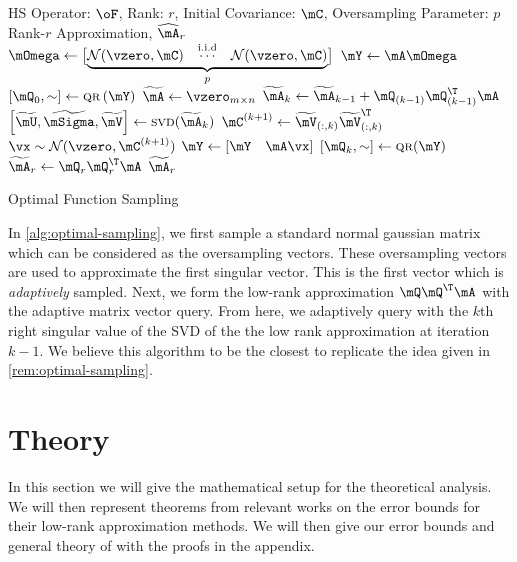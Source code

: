 \documentclass[10pt]{article}
\newcommand{\ccref}[1]{\textcolor{darkred}{\cref{#1}}}
\newcommand{\Ccref}[1]{\textcolor{darkred}{\Cref{#1}}}
\theoremstyle{plain}
\theoremstyle{definition}
\theoremstyle{remark}
\begin{document}
\begin{algorithm}
\begin{algorithmic}[1]
	 HS Operator: $\oF$, Rank: $r$, Initial Covariance: $\mC$, Oversampling Parameter: $p$
	 Rank-$r$ Approximation, $\widehat{\mA}_r$
	\State $\mOmega \gets \bigl[\underbrace{\mathcal{N}(\vzero, \mC)\quad \overset{\mathrm{i.i.d}}{\cdots} \quad \mathcal{N}(\vzero,\mC)}_{p}\bigr]$ 
	\State $\mY \gets \mA \mOmega$ 
	\State $\left[\mQ_0, \sim\right] \gets \textsc{qr}\left(\mY\right) $ 
	\State $\widetilde{\mA} \gets \vzero_{m \times n}$ 
	\State $\widetilde{\mA}_{k} \gets \widetilde{\mA}_{k-1} + \mQ_{(k-1)}\mQ_{(k-1)}^{\T}\mA$ 
	\State $\left[\widetilde{\mU}, \widetilde{\mSigma}, \widetilde{\mV}\right] \gets \textsc{svd}(\widetilde{\mA}_k)$
	\State $\displaystyle \mC^{(k+1)} \gets \widetilde{\mV}_{(:,k)}\widetilde{\mV}_{(:,k)}^{\T}$
	\State $\vx \sim \mathcal{N}(\vzero, \mC^{(k+1)})$
	\State $\mY \gets \left[\mY \quad \mA\vx\right]$ 
	\State $\left[\mQ_{k}, \sim\right] \gets \textsc{qr}(\mY)$
	\EndFor
	\State $\widetilde{\mA}_{r} \gets \mQ_r \mQ_r^{\T} \mA$ 
	$ \widetilde{\mA}_{r} $
\end{algorithmic}
\caption{Optimal Function Sampling}
\label{alg:optimal-sampling}
\end{algorithm}

In \ccref{alg:optimal-sampling}, we first sample a standard normal gaussian matrix which can be considered as the oversampling vectors. These oversampling vectors are used to approximate the first singular vector. This is the first vector which is {\em adaptively} sampled. Next, we form the low-rank approximation $\mQ\mQ^{\T}\mA$ with the adaptive matrix vector query. From here, we adaptively query with the $k$th right singular value of the \textsc{SVD} of the the low rank approximation at iteration $k-1$. We believe this algorithm to be the closest to replicate the idea given in \ccref{rem:optimal-sampling}. 
\section{Theory}
In this section we will give the mathematical setup for the theoretical analysis. We will then represent theorems from relevant works on the error bounds for their low-rank approximation methods. We will then give our error bounds and general theory of \Ccref{alg:optimal-sampling} with the proofs in the appendix.
\end{document}

